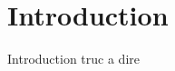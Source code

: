 \section{Introduction}

\begin{frame}
\end{frame}

\begin{frame}{Introduction}
truc a dire
\end{frame}